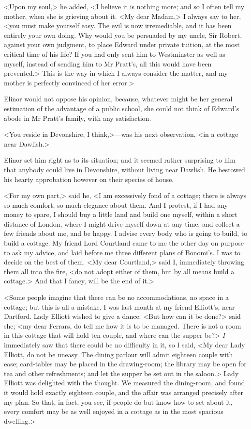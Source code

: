 <Upon my soul,> he added, <I believe it is nothing more; and so I often tell my mother, when she is grieving about it. <My dear Madam,> I always say to her, <you must make yourself easy. The evil is now irremediable, and it has been entirely your own doing. Why would you be persuaded by my uncle, Sir Robert, against your own judgment, to place Edward under private tuition, at the most critical time of his life? If you had only sent him to Westminster as well as myself, instead of sending him to Mr Pratt's, all this would have been prevented.> This is the way in which I always consider the matter, and my mother is perfectly convinced of her error.>

Elinor would not oppose his opinion, because, whatever might be her general estimation of the advantage of a public school, she could not think of Edward's abode in Mr Pratt's family, with any satisfaction.

<You reside in Devonshire, I think,>—was his next observation, <in a cottage near Dawlish.>

Elinor set him right as to its situation; and it seemed rather surprising to him that anybody could live in Devonshire, without living near Dawlish. He bestowed his hearty approbation however on their species of house.

<For my own part,> said he, <I am excessively fond of a cottage; there is always so much comfort, so much elegance about them. And I protest, if I had any money to spare, I should buy a little land and build one myself, within a short distance of London, where I might drive myself down at any time, and collect a few friends about me, and be happy. I advise every body who is going to build, to build a cottage. My friend Lord Courtland came to me the other day on purpose to ask my advice, and laid before me three different plans of Bonomi's. I was to decide on the best of them. <My dear Courtland,> said I, immediately throwing them all into the fire, <do not adopt either of them, but by all means build a cottage.> And that I fancy, will be the end of it.>

<Some people imagine that there can be no accommodations, no space in a cottage; but this is all a mistake. I was last month at my friend Elliott's, near Dartford. Lady Elliott wished to give a dance. <But how can it be done?> said she; <my dear Ferrars, do tell me how it is to be managed. There is not a room in this cottage that will hold ten couple, and where can the supper be?> \textit{I} immediately saw that there could be no difficulty in it, so I said, <My dear Lady Elliott, do not be uneasy. The dining parlour will admit eighteen couple with ease; card-tables may be placed in the drawing-room; the library may be open for tea and other refreshments; and let the supper be set out in the saloon.> Lady Elliott was delighted with the thought. We measured the dining-room, and found it would hold exactly eighteen couple, and the affair was arranged precisely after my plan. So that, in fact, you see, if people do but know how to set about it, every comfort may be as well enjoyed in a cottage as in the most spacious dwelling.>


